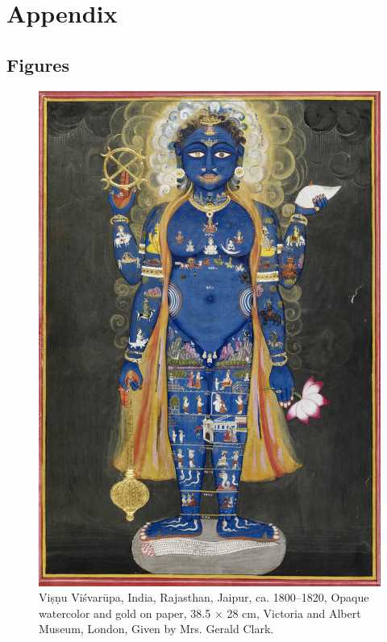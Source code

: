 \chapter{Appendix}
\section{Figures}

\clearpage
  \begin{figure}[ht]
	\centering
  \includegraphics[width=1\textwidth]{pics/Vishnu_Vishvarupa_cropped.jpg}
	\caption{Viṣṇu Viśvarūpa, India, Rajasthan, Jaipur, ca. 1800–1820, Opaque watercolor and gold on paper, 38.5 × 28 cm, Victoria and Albert Museum, London, Given by Mrs. Gerald Clark.}
	\label{fig1}
      \end{figure}
\clearpage
